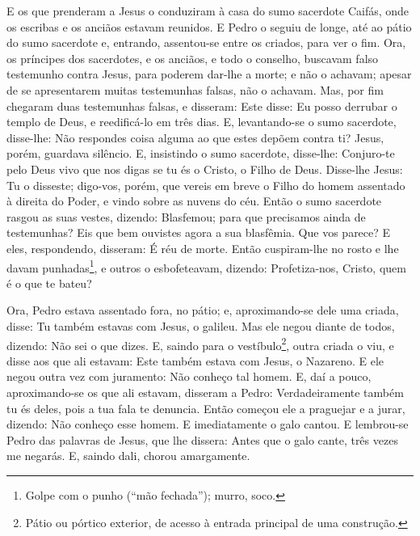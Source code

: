 E os que prenderam a Jesus o conduziram à casa do sumo sacerdote
Caifás, onde os escribas e os anciãos estavam reunidos. E
Pedro o seguiu de longe, até ao pátio do sumo sacerdote e, entrando,
assentou-se entre os criados, para ver o fim. Ora, os
príncipes dos sacerdotes, e os anciãos, e todo o conselho, buscavam
falso testemunho contra Jesus, para poderem dar-lhe a morte;
e não o achavam; apesar de se apresentarem muitas testemunhas
falsas, não o achavam. Mas, por fim chegaram duas testemunhas
falsas, e disseram: Este disse: Eu posso derrubar o templo de
Deus, e reedificá-lo em três dias. E, levantando-se o sumo
sacerdote, disse-lhe: Não respondes coisa alguma ao que estes depõem
contra ti? Jesus, porém, guardava silêncio. E, insistindo o
sumo sacerdote, disse-lhe: Conjuro-te pelo Deus vivo que nos digas
se tu és o Cristo, o Filho de Deus. Disse-lhe Jesus: Tu o
disseste; digo-vos, porém, que vereis em breve o Filho do homem
assentado à direita do Poder, e vindo sobre as nuvens do céu.
Então o sumo sacerdote rasgou as suas vestes, dizendo:
Blasfemou; para que precisamos ainda de testemunhas? Eis que bem
ouvistes agora a sua blasfêmia. Que vos parece? E eles,
respondendo, disseram: É réu de morte. Então cuspiram-lhe no
rosto e lhe davam punhadas\footnote{Golpe com o punho (``mão
fechada''); murro, soco.}, e outros o esbofeteavam, dizendo:
Profetiza-nos, Cristo, quem é o que te bateu?

Ora, Pedro estava assentado fora, no pátio; e, aproximando-se
dele uma criada, disse: Tu também estavas com Jesus, o galileu.
Mas ele negou diante de todos, dizendo: Não sei o que dizes.
E, saindo para o vestíbulo\footnote{Pátio ou pórtico
exterior, de acesso à entrada principal de uma construção.}, outra
criada o viu, e disse aos que ali estavam: Este também estava com
Jesus, o Nazareno. E ele negou outra vez com juramento: Não
conheço tal homem. E, daí a pouco, aproximando-se os que ali
estavam, disseram a Pedro: Verdadeiramente também tu és deles, pois
a tua fala te denuncia. Então começou ele a praguejar e a
jurar, dizendo: Não conheço esse homem. E imediatamente o galo
cantou. E lembrou-se Pedro das palavras de Jesus, que lhe
dissera: Antes que o galo cante, três vezes me negarás. E, saindo
dali, chorou amargamente.

\medskip

